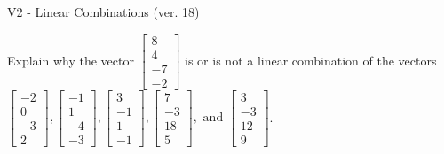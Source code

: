 \begin{exercise}
  \begin{exerciseTitle}V2 - Linear Combinations (ver. 18)\end{exerciseTitle}
  \begin{exerciseStatement}
    Explain why the vector \(\left[\begin{array}{c}
8 \\
4 \\
-7 \\
-2
\end{array}\right]\)  is or is not a linear 
	combination of the vectors \(\left[\begin{array}{c}
-2 \\
0 \\
-3 \\
2
\end{array}\right] , \left[\begin{array}{c}
-1 \\
1 \\
-4 \\
-3
\end{array}\right] , \left[\begin{array}{c}
3 \\
-1 \\
1 \\
-1
\end{array}\right] , \left[\begin{array}{c}
7 \\
-3 \\
18 \\
5
\end{array}\right] , \text{ and } \left[\begin{array}{c}
3 \\
-3 \\
12 \\
9
\end{array}\right]\).
	



\end{exerciseStatement}
\end{exercise}
